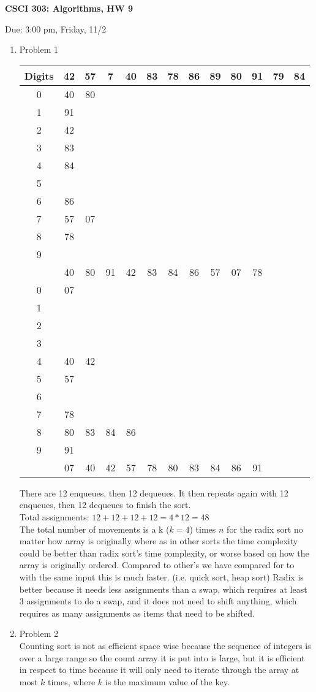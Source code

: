 \documentclass[11pt]{article}
\begin{document}
\begin{LARGE}
\centerline {\bf CSCI 303: Algorithms, HW 9}
\end{LARGE}
\vskip 0.25cm
\centerline{Due: 3:00 pm, Friday, 11/2}

\begin{enumerate}
\item Problem 1\\
\begin{center}
\begin{tabular}{c|cccccccccccc}
Digits & 42& 57& 7& 40& 83& 78& 86& 89& 80& 91& 79& 84 \\\hline
0&40&80\\
1&91\\
2&42\\
3&83\\
4&84\\
5&\\
6&86\\
7&57&07\\
8&78\\
9&\\
\hline
&40&80&91&42&83&84&86&57&07&78\\
\hline
0&07\\
1&\\
2&\\
3&\\
4&40&42\\
5&57\\
6&\\
7&78\\
8&80&83&84&86\\
9&91\\
\hline
&07&40&42&57&78&80&83&84&86&91
\end{tabular}
\end{center}
There are 12 enqueues, then 12 dequeues. It then repeats again with 12 enqueues, then 12 dequeues to finish the sort.\\
Total assignments:
$12 + 12 +  12 + 12 = 4 * 12 = 48$\\
The total number of movements is a k ($k=4$) times $n$ for the radix  sort no matter how array is originally where as in other sorts the time complexity could be better than radix sort's time complexity, or worse based on how the array is originally ordered. Compared to other's we have compared for to with the same input this is much faster. (i.e. quick sort, heap sort) Radix is better because it needs less assignments than a swap, which requires at least 3 assignments to do a swap, and it does not need to shift anything, which requires as many assignments as items that need to be shifted.
\item Problem 2\\
Counting sort is not as efficient space wise because the sequence of integers is over a large range so the count array it is put into is large, but it is efficient in respect to time because it will only need to iterate through the array at most $k$ times, where $k$ is the maximum value of the key.
\end{enumerate}
\end{document}
